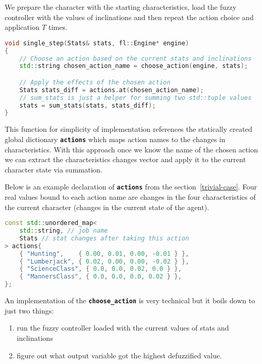 \documentclass[12pt, a4paper]{article}
\begin{document}
	We prepare the character with the starting characteristics, load the fuzzy controller with the values of inclinations and then repeat the action choice and application $T$ times.
	
	\begin{lstlisting}[language=c++]
void single_step(Stats& stats, fl::Engine* engine)
{
	// Choose an action based on the current stats and inclinations
	std::string chosen_action_name = choose_action(engine, stats);

	// Apply the effects of the chosen action
	Stats stats_diff = actions.at(chosen_action_name);
	// sum_stats is just a helper for summing two std::tuple values
	stats = sum_stats(stats, stats_diff);
}
	\end{lstlisting}
	
	This function for simplicity of implementation references the statically created global dictionary \textbf{\texttt{actions}} which maps action names to the changes in characteristics.
	With this approach once we know the name of the chosen action we can extract the characteristics changes vector and apply it to the current character state via summation.
	
	Below is an example declaration of \textbf{\texttt{actions}} from the section~\ref{trivial-case}.
	Four real values bound to each action name are changes in the four characteristics of the current character (changes in the current state of the agent).
	
	\begin{lstlisting}[language=c++]
const std::unordered_map<
	std::string, // job name
	Stats // stat changes after taking this action
> actions{
	{ "Hunting",    { 0.00, 0.01, 0.00, -0.01 } },
	{ "Lumberjack", { 0.02, 0.00, 0.00, -0.02 } },
	{ "ScienceClass", { 0.0, 0.0, 0.02, 0.0 } },
	{ "MannersClass", { 0.0, 0.0, 0.0, 0.02 } },
};	
	\end{lstlisting}
	
	An implementation of the \textbf{\texttt{choose\_action}} is very technical but it boils down to just two things:
	
	\begin{enumerate}
		\item run the fuzzy controller loaded with the current values of stats and inclinations
		\item figure out what output variable got the highest defuzzified value.
	\end{enumerate}
	
\end{document}
